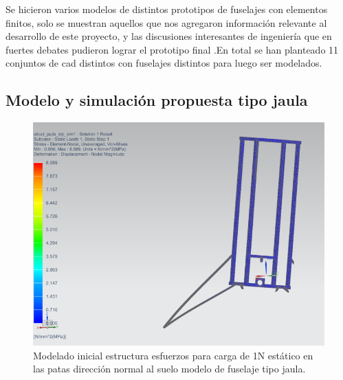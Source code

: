 \medskip

Se hicieron varios modelos de distintos prototipos de fuselajes con elementos finitos, solo se muestran aquellos que nos agregaron información relevante al desarrollo de este proyecto, y las discusiones interesantes de ingeniería que en fuertes debates pudieron lograr el prototipo final .En total se han planteado 11 conjuntos de cad distintos con fuselajes distintos para luego ser modelados.

\null\newpage
\clearpage

\subsection{Modelo y simulación propuesta tipo jaula}
\begin{figure}[htb]
    \centering
    \includegraphics[width=\linewidth]{fig/fea/jaula.png}
    \caption{Modelado inicial estructura esfuerzos para carga de 1N estático en las patas dirección normal al suelo modelo de fuselaje tipo jaula.}
    \label{fig:fea/jaula}
\end{figure}

